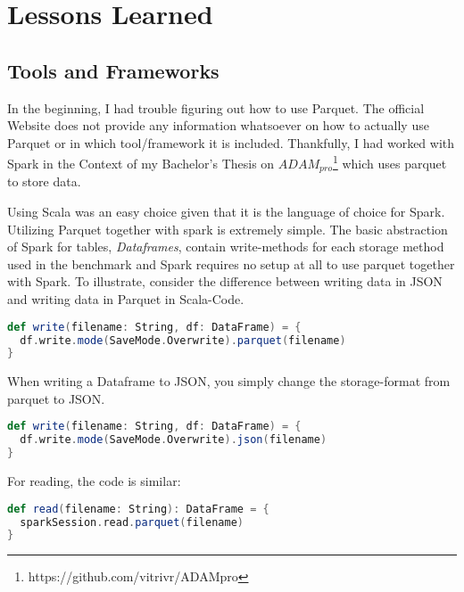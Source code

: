 \section{Lessons Learned} \label{sec:lessons_learned}

\subsection{Tools and Frameworks}
In the beginning, I had trouble figuring out how to use Parquet.
The official Website does not provide any information whatsoever on how to actually use Parquet or in which tool/framework it is included.
Thankfully, I had worked with Spark in the Context of my Bachelor's Thesis on $ADAM_{pro}$\footnote{https://github.com/vitrivr/ADAMpro} which uses parquet to store data.

Using Scala was an easy choice given that it is the language of choice for Spark.
Utilizing Parquet together with spark is extremely simple.
The basic abstraction of Spark for tables, \textit{Dataframes}, contain write-methods for each storage method used in the benchmark and Spark requires no setup at all to use parquet together with Spark.
To illustrate, consider the difference between writing data in JSON and writing data in Parquet in Scala-Code.

\renewcommand{\lstlistingname}{Code}

\begin{lstlisting}[language=Scala,caption=Saving a Dataframe with Parquet, label=amb]
def write(filename: String, df: DataFrame) = {
  df.write.mode(SaveMode.Overwrite).parquet(filename)
}
\end{lstlisting}

When writing a Dataframe to JSON, you simply change the storage-format from parquet to JSON.

\begin{lstlisting}[language=Scala,caption=Saving a Dataframe with JSON, label=amb]
def write(filename: String, df: DataFrame) = {
  df.write.mode(SaveMode.Overwrite).json(filename)
}
\end{lstlisting}

For reading, the code is similar:

\begin{lstlisting}[language=Scala,caption=Reading a Dataframe with Parquet, label=amb]
def read(filename: String): DataFrame = {
  sparkSession.read.parquet(filename)
}
\end{lstlisting}

